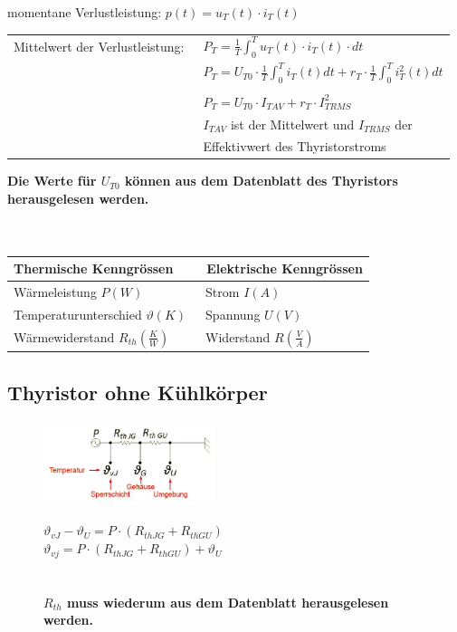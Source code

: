 momentane Verlustleistung: $p(t) = u_{T}(t) \cdot i_{T}(t)$\\
\begin{tabular}{ll}
  Mittelwert der Verlustleistung: &\ $P_{T} = \frac{1}{T}\int_{0}^{T}u_{T}(t) \cdot i_{T}(t) \cdot dt$\\
  &\ $P_{T} = U_{T0} \cdot \frac{1}{T}\int_{0}^{T}i_{T}(t)dt+r_{T} \cdot \frac{1}{T}\int_{0}^{T}i_{T}^2(t)dt$\\\\
  &\ $P_{T} = U_{T0} \cdot I_{T AV} + r_{T} \cdot I_{T RMS}^2$\\
  &\ $I_{T AV}$ ist der Mittelwert und $I_{T RMS}$ der\\ &\ Effektivwert des Thyristorstroms\\
\end{tabular}

\textbf{Die Werte für $U_{T0}$ können aus dem Datenblatt des Thyristors herausgelesen werden.}\\\\\\
\begin{tabular}{|l|l|}
  \hline
  \textbf{Thermische Kenngrössen} &\ \textbf{Elektrische Kenngrössen}\\
  \hline
  Wärmeleistung $ P (W) $ &\ Strom $ I (A) $\\
  \hline
  Temperaturunterschied $\vartheta (K)$ &\ Spannung $U (V)$\\
  \hline
  Wärmewiderstand $R_{th} (\frac{K}{W})$ &\ Widerstand $R (\frac{V}{A})$\\
  \hline
\end{tabular}

\subsection{Thyristor ohne Kühlkörper}
\begin{figure}[htbp]
  \begin{minipage}[t]{6cm}
    \vspace{0pt}
    \centering
    \includegraphics[width = 5cm]{./pictures/ohneKuehlkoerper} 
  \end{minipage}
  \hfill
  \begin{minipage}[t]{6cm}
    \vspace{0pt}
    $\vartheta_{vJ} - \vartheta_{U} = P \cdot (R_{th JG}+ R_{th GU})$\\
    $ \vartheta_{vj} = P \cdot (R_{th JG}+ R_{th GU}) + \vartheta_{U}$\\\\\\
    \textbf{$R_{th}$ muss wiederum aus dem Datenblatt herausgelesen werden.}
  \end{minipage}
\end{figure}

